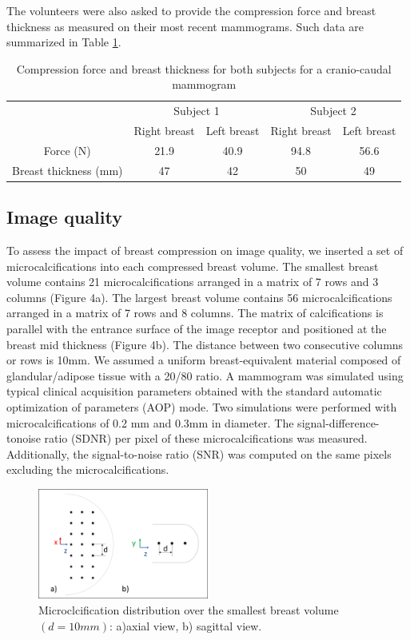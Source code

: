 The volunteers were also asked to provide the compression force and breast thickness as measured on their most recent mammograms. Such data are summarized in Table \ref{tab:forceandthichnessdata}.
\begin{table}[H]
\centering
\begin{tabular}{c|c|c||c|c|}
\cline{2-5}
&\multicolumn{2}{c||}{Subject 1}&\multicolumn{2}{c|}{Subject 2}\\
\cline{2-5}
& Right breast & Left breast & Right breast & Left breast\\
\cline{2-5}
\hline
\multicolumn{1}{|c||}{Force (N)}  & 21.9 &40.9 &94.8 & 56.6 \\
\hline
\multicolumn{1}{|c||}{ Breast thickness (mm)} & 47 & 42 & 50 & 49 \\
\hline

\end{tabular}
\caption{Compression force and breast thickness for both subjects for a cranio-caudal mammogram}\label{tab:forceandthichnessdata}
\end{table}

\subsection{Image quality }\label{section:averagegalndulardose}
To assess the impact of breast compression on image quality, we inserted a set of microcalcifications into each compressed breast volume. The smallest breast volume contains 21 microcalcifications arranged in a matrix of 7 rows and 3 columns (Figure 4a). The largest breast volume contains 56 microcalcifications arranged in a matrix of 7 rows and 8 columns. The matrix of calcifications is parallel with the entrance surface of the image receptor and positioned at the breast mid thickness (Figure 4b). The distance between two consecutive columns or rows is 10mm. We assumed a uniform breast-equivalent material composed of glandular/adipose tissue with a 20/80 ratio. A mammogram was simulated using typical clinical acquisition parameters obtained with the standard automatic optimization of parameters (AOP) mode. Two simulations were performed with microcalcifications of 0.2 mm and 0.3mm in diameter. The signal-difference-tonoise ratio (SDNR) per pixel of these microcalcifications was measured. Additionally, the signal-to-noise ratio (SNR) was computed on the same pixels excluding the microcalcifications.  


\begin{figure}[!h]
\centering
\includegraphics[width=0.5\textwidth,keepaspectratio]{figures/microcalcifications.png} 
\caption{Microclcification distribution over the smallest breast volume $(d=10mm)$: a)axial view, b) sagittal view.}\label{fig:compressionpaddles}
\end{figure}

